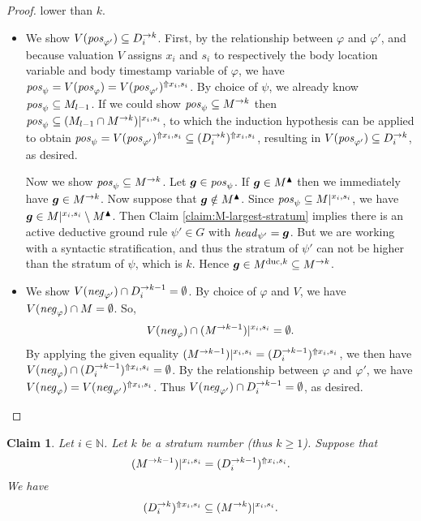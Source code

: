 \documentclass{tlp}
\newtheorem{claim}[theorem]{Claim}
\newcommand{\Nat}{\mathbb{N}}  \newcommand{\len}[1]{|#1|} \newcommand{\rom}[1]{\text{\emph{(#1)}}} \newcommand{\romI}{\rom i}
\newcommand{\fcB}{\boldsymbol{g}}
\newcommand{\rl}{\varphi}
\newcommand{\head}[1]{\fname{head}_{#1}}
\newcommand{\bpos}[1]{\fname{pos}_{#1}}
\newcommand{\bneg}[1]{\fname{neg}_{#1}}
\newcommand{\grl}{\psi}
\newcommand{\sh}[1]{(#1)}
\newcommand{\addlt}[3]{#1^{\Uparrow#2,#3}}
\newcommand{\projlt}[3]{#1|^{#2,#3}}
\newcommand{\shprojlt}[3]{\projlt{\sh{#1}}{#2}{#3}}
\newcommand{\shaddlt}[3]{\addlt{\sh{#1}}{#2}{#3}}
\newcommand{\grded}{G}
\begin{document}
\begin{appendix}
\begin{proof}
lower than $k$. 
\begin{itemize}
\item We show $V(\bpos{\rl'})\subseteq\strat{D_{i}}k$. First, by the relationship
between $\rl$ and $\rl'$, and because valuation $V$ assigns $x_{i}$
and $s_{i}$ to respectively the body location variable and body timestamp
variable of $\rl$, we have $\bpos{\grl}=V(\bpos{\rl})=\addlt{V(\bpos{\rl'})}{x_{i}}{s_{i}}$.
By choice of $\grl$, we already know $\bpos{\grl}\subseteq M_{l-1}$.
If we could show $\bpos{\grl}\subseteq\strat Mk$ then $\bpos{\grl}\subseteq\shprojlt{M_{l-1}\cap\strat Mk}{x_{i}}{s_{i}}$,
to which the induction hypothesis can be applied to obtain $\bpos{\grl}=\addlt{V(\bpos{\rl'})}{x_{i}}{s_{i}}\subseteq\shaddlt{\strat{D_{i}}k}{x_{i}}{s_{i}}$,
resulting in $V(\bpos{\rl'})\subseteq\strat{D_{i}}k$, as desired. 


Now we show $\bpos{\grl}\subseteq\strat Mk$. Let $\fcB\in\bpos{\grl}$.
If $\fcB\in\up M$ then we immediately have $\fcB\in\strat Mk$. Now
suppose that $\fcB\notin\up M$. Since $\bpos{\grl}\subseteq\projlt M{x_{i}}{s_{i}}$,
we have $\fcB\in\projlt M{x_{i}}{s_{i}}\setminus\up M$. Then Claim
\ref{claim:M-largest-stratum} implies there is an active deductive
ground rule $\grl'\in\grded$ with $\head{\grl'}=\fcB$. But we are
working with a syntactic stratification, and thus the stratum of $\grl'$
can not be higher than the stratum of $\grl$, which is $k$. Hence
$\fcB\in\duc Mk\subseteq\strat Mk$.

\item We show $V(\bneg{\rl'})\cap\strat{D_{i}}{k-1}=\emptyset$. By choice
of $\rl$ and $V$, we have $V(\bneg{\rl})\cap M=\emptyset$. So,
\[
V(\bneg{\rl})\cap\shprojlt{\strat M{k-1}}{x_{i}}{s_{i}}=\emptyset.
\]
By applying the given equality $\shprojlt{\strat M{k-1}}{x_{i}}{s_{i}}=\shaddlt{\strat{D_{i}}{k-1}}{x_{i}}{s_{i}}$,
we then have $V(\bneg{\rl})\cap\shaddlt{\strat{D_{i}}{k-1}}{x_{i}}{s_{i}}=\emptyset$.
By the relationship between $\rl$ and $\rl'$, we have $V(\bneg{\rl})=\addlt{V(\bneg{\rl'})}{x_{i}}{s_{i}}$.
Thus $V(\bneg{\rl'})\cap\strat{D_{i}}{k-1}=\emptyset$, as desired. 
\end{itemize}
\end{proof}



\tline



\begin{claim}\label{claim:strat-k-D-in-M}Let $i\in\Nat$. Let $k$
be a stratum number (thus $k\geq1$). Suppose that 
\[
\shprojlt{\strat M{k-1}}{x_{i}}{s_{i}}=\shaddlt{\strat{D_{i}}{k-1}}{x_{i}}{s_{i}}.
\]
We have 
\[
\shaddlt{\strat{D_{i}}k}{x_{i}}{s_{i}}\subseteq\shprojlt{\strat Mk}{x_{i}}{s_{i}}.
\]
\end{claim}


\end{appendix}
\end{document}
